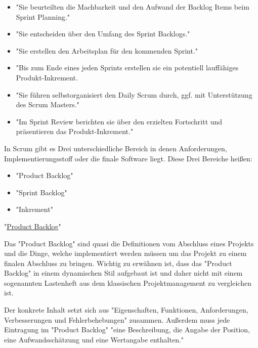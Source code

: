 \begin{itemize}
    \item "Sie beurteilten die Machbarkeit und den Aufwand der Backlog Items beim Sprint Planning." \cite{Entwicklungsteam}
    \item "Sie entscheiden über den Umfang des Sprint Backlogs." \cite{Entwicklungsteam}
    \item "Sie erstellen den Arbeitsplan für den kommenden Sprint." \cite{Entwicklungsteam}
    \item "Bis zum Ende eines jeden Sprints erstellen sie ein potentiell lauffähiges Produkt-Inkrement. \cite{Entwicklungsteam}
    \item "Sie führen selbstorganisiert den Daily Scrum durch, ggf. mit Unterstützung des Scrum Masters." \cite{Entwicklungsteam}
    \item "Im Sprint Review berichten sie über den erzielten Fortschritt und präsentieren das Produkt-Inkrement." \cite{Entwicklungsteam}
\end{itemize}


In Scrum gibt es Drei unterschiedliche Bereich in denen Anforderungen, Implementierungsstoff oder die finale Software liegt. Diese Drei Bereiche heißen:

\begin{itemize}
    \item "Product Backlog"
    \item "Sprint Backlog"
    \item "Inkrement"
\end{itemize}

\cite{Scrum}

"\underline{Product Backlog}"

Das "Product Backlog" sind quasi die Definitionen vom Abschluss eines Projekts und die Dinge, welche implementiert werden müssen um das Projekt zu einem finalen Abschluss zu bringen. Wichtig zu erwähnen ist, dass das "Product Backlog" in einem dynamischen Stil aufgebaut ist und daher nicht mit einem sogenannten Lastenheft aus dem klassischen Projektmanagement zu vergleichen ist.

Der konkrete Inhalt setzt sich aus "Eigenschaften, Funktionen, Anforderungen, Verbesserungen und Fehlerbehebungen" \cite{ProductBacklog} zusammen.  Außerdem muss jede Eintragung im "Product Backlog" "eine Beschreibung, die Angabe der Position, eine Aufwandsschätzung und eine Wertangabe enthalten." \cite{ProductBacklog}

